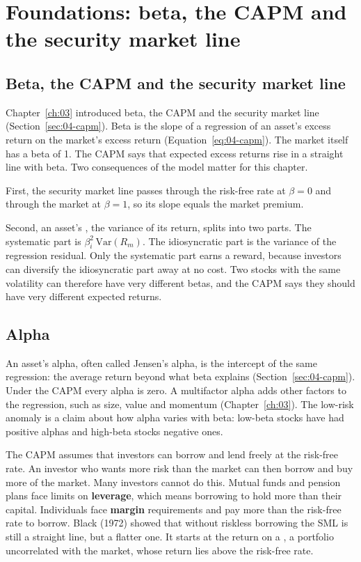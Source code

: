 \section{Foundations: beta, the CAPM and the security market line}
\label{sec:18-foundations}

\subsection{Beta, the CAPM and the security market line}

Chapter~\ref{ch:03} introduced beta, the CAPM and the security market line (Section~\ref{sec:04-capm}). Beta is the slope of a regression of an asset's excess return on the market's excess return (Equation~\eqref{eq:04-capm}). The market itself has a beta of 1. The CAPM says that expected excess returns rise in a straight line with beta. Two consequences of the model matter for this chapter.

First, the security market line passes through the risk-free rate at $\beta = 0$ and through the market at $\beta = 1$, so its slope equals the market premium.

Second, an asset's , the variance of its return, splits into two parts. The systematic part is $\beta_i^2\,\mathrm{Var}(R_m)$. The idiosyncratic part is the variance of the regression residual. Only the systematic part earns a reward, because investors can diversify the idiosyncratic part away at no cost. Two stocks with the same volatility can therefore have very different betas, and the CAPM says they should have very different expected returns.

\subsection{Alpha}

An asset's alpha, often called Jensen's alpha, is the intercept of the same regression: the average return beyond what beta explains (Section~\ref{sec:04-capm}). Under the CAPM every alpha is zero. A multifactor alpha adds other factors to the regression, such as size, value and momentum (Chapter~\ref{ch:03}). The low-risk anomaly is a claim about how alpha varies with beta: low-beta stocks have had positive alphas and high-beta stocks negative ones.

The CAPM assumes that investors can borrow and lend freely at the risk-free rate. An investor who wants more risk than the market can then borrow and buy more of the market. Many investors cannot do this. Mutual funds and pension plans face limits on \textbf{leverage}, which means borrowing to hold more than their capital. Individuals face \textbf{margin} requirements and pay more than the risk-free rate to borrow. Black (1972) showed that without riskless borrowing the SML is still a straight line, but a flatter one. It starts at the return on a , a portfolio uncorrelated with the market, whose return lies above the risk-free rate.

